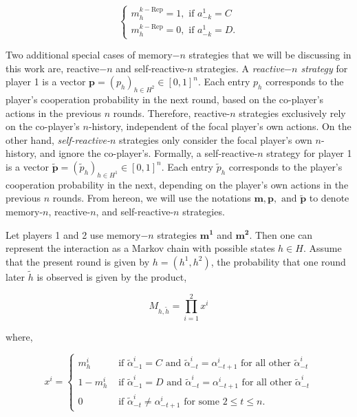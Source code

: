 \documentclass{article}
\theoremstyle{definition}
\begin{document}
$$
\begin{cases}
  m^{k-\text{Rep}}_h\!=\!1, \text{ if } a^1_{-k}\!=\!C\\[1em]
  m^{k-\text{Rep}}_h\!=\!0, \text{ if } a^1_{-k}\!=\!D.
\end{cases}
$$

Two additional special cases of memory$-n$ strategies that we will be discussing in
this work are, reactive$-n$ and self-reactive-$n$ strategies. A {\it
reactive$-n$ strategy} for player 1 is a vector
$\mathbf{p}=(p_h)_{h\in H^2} \in [0, 1]^{n}$. Each entry $p_h$ corresponds to
the player's cooperation probability in the next round, based on the co-player's
actions in the previous $n$ rounds. Therefore, reactive-$n$ strategies
exclusively rely on the co-player's $n$-history, independent of the focal
player's own actions. On the other hand, {\it self-reactive-$n$}
strategies only consider the focal player's own $n$-history, and ignore the
co-player's. Formally, a self-reactive-$n$ strategy for player 1 is a vector
$\mathbf{\tilde{p}} = (\tilde{p}_h)_{h \in H^1} \in [0, 1] ^ {n}$. Each entry
$\tilde{p}_h$ corresponds to the player's cooperation probability in the next,
depending on the player's own actions in the previous $n$ rounds.
From hereon, we will use the notations $\mathbf{m}, \mathbf{p}, \text{ and }
\mathbf{\tilde{p}}$ to denote memory-$n$, reactive-$n$, and self-reactive-$n$
strategies.

Let players 1 and 2 use memory$-n$ strategies $\mathbf{m^{1}}$ and
$\mathbf{m^{2}}$. Then one can represent the interaction as a Markov chain with
possible states $h \in H$. Assume that the present round is given by \(h =
(h^{1}, h^{2})\), the probability that one round later \(\tilde{h}\) is observed
is given by the product,

$$
  M_{h, \tilde{h}} = \prod_{i=1}^{2} x^{i}
$$

where,

$$
x^i = 
\begin{cases}
  m^{i}_{h} & \text{ if } \tilde{\alpha}^i_{-1} = C \text{ and } \tilde{\alpha}^i_{-t} = \alpha^i_{-t + 1} \text{ for all other } \tilde{\alpha}^i_{-t}\\
  1 - m^{i}_{h} & \text{ if } \tilde{\alpha}^i_{-1} = D \text{ and } \tilde{\alpha}^i_{-t} = \alpha^i_{-t + 1} \text{ for all other } \tilde{\alpha}^i_{-t}\\
  0 & \text{ if } \tilde{\alpha}^i_{-t} \neq  \alpha^i_{-t + 1} \text{ for some } 2 \leq t \leq n.
\end{cases}
$$
\end{document}
